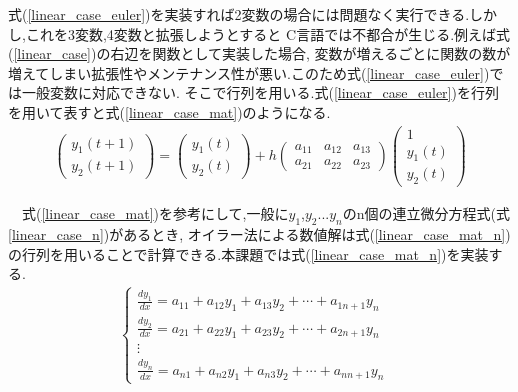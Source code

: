 \documentclass[a4j]{jarticle}
\begin{document}
    式(\ref{linear_case_euler})を実装すれば2変数の場合には問題なく実行できる.しかし,これを3変数,4変数と拡張しようとすると
    C言語では不都合が生じる.例えば式(\ref{linear_case})の右辺を関数として実装した場合,
    変数が増えるごとに関数の数が増えてしまい拡張性やメンテナンス性が悪い.このため式(\ref{linear_case_euler})では一般変数に対応できない.
    そこで行列を用いる.式(\ref{linear_case_euler})を行列を用いて表すと式(\ref{linear_case_mat})のようになる.
    \begin{eqnarray}
        \left(
          \begin{array}{c}
            y_1(t+1)  \\
            y_2(t+1)  
          \end{array}
        \right)
      =
        \left(
          \begin{array}{ccc}
            y_1(t) \\
            y_2(t) 
          \end{array}
        \right)
        +
        h\left(
          \begin{array}{ccc}
            a_{11} & a_{12} & a_{13} \\
            a_{21} & a_{22} & a_{23}
          \end{array}
        \right)
        \left(
          \begin{array}{ccc}
            1 \\
            y_1(t) \\
            y_2(t)
          \end{array}
        \right)
      \label{linear_case_mat}
    \end{eqnarray}

    　式(\ref{linear_case_mat})を参考にして,一般に$y_1$,$y_2$...$y_n$のn個の連立微分方程式(式\ref{linear_case_n})があるとき,
    オイラー法による数値解は式(\ref{linear_case_mat_n})の行列を用いることで計算できる.本課題では式(\ref{linear_case_mat_n})を実装する.
    \begin{eqnarray}
      \begin{cases}
        \frac{dy_1}{dx} = a_{11} + a_{12} y_1 + a_{13} y_2 + \cdots + a_{1n+1} y_n & \\
        \frac{dy_2}{dx} = a_{21} + a_{22} y_1 + a_{23} y_2 + \cdots + a_{2n+1} y_n & \\
        　　　　 \vdots & \\
        \frac{dy_n}{dx} = a_{n1} + a_{n2} y_1 + a_{n3} y_2 + \cdots + a_{nn+1} y_n
      \end{cases}
      \label{linear_case_n}
    \end{eqnarray}      
\end{document}
